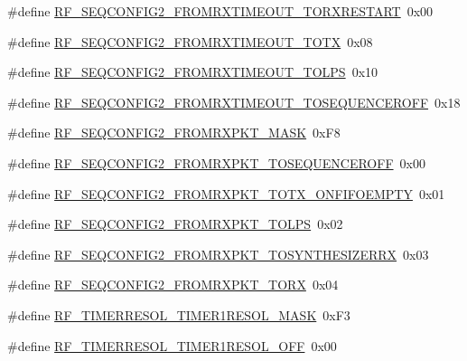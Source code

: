 \begin{DoxyCompactItemize}
\#define \hyperlink{sx1276Regs-Fsk_8h_a61f477238d6ab34794c6beb2075f7c74}{R\+F\+\_\+\+S\+E\+Q\+C\+O\+N\+F\+I\+G2\+\_\+\+F\+R\+O\+M\+R\+X\+T\+I\+M\+E\+O\+U\+T\+\_\+\+T\+O\+R\+X\+R\+E\+S\+T\+A\+RT}~0x00
\item 
\#define \hyperlink{sx1276Regs-Fsk_8h_aafadf4e3c6d5afde4f45a52b150ac010}{R\+F\+\_\+\+S\+E\+Q\+C\+O\+N\+F\+I\+G2\+\_\+\+F\+R\+O\+M\+R\+X\+T\+I\+M\+E\+O\+U\+T\+\_\+\+T\+O\+TX}~0x08
\item 
\#define \hyperlink{sx1276Regs-Fsk_8h_a1e8856528e554ac06c0b15a0331af25f}{R\+F\+\_\+\+S\+E\+Q\+C\+O\+N\+F\+I\+G2\+\_\+\+F\+R\+O\+M\+R\+X\+T\+I\+M\+E\+O\+U\+T\+\_\+\+T\+O\+L\+PS}~0x10
\item 
\#define \hyperlink{sx1276Regs-Fsk_8h_ac8284b2e9e769af716e7e9e69d7489c3}{R\+F\+\_\+\+S\+E\+Q\+C\+O\+N\+F\+I\+G2\+\_\+\+F\+R\+O\+M\+R\+X\+T\+I\+M\+E\+O\+U\+T\+\_\+\+T\+O\+S\+E\+Q\+U\+E\+N\+C\+E\+R\+O\+FF}~0x18
\item 
\#define \hyperlink{sx1276Regs-Fsk_8h_af969ae590556e2c15a447e7fc528bd41}{R\+F\+\_\+\+S\+E\+Q\+C\+O\+N\+F\+I\+G2\+\_\+\+F\+R\+O\+M\+R\+X\+P\+K\+T\+\_\+\+M\+A\+SK}~0x\+F8
\item 
\#define \hyperlink{sx1276Regs-Fsk_8h_a6540dab5dd5ba1667a344a2c1f40a16e}{R\+F\+\_\+\+S\+E\+Q\+C\+O\+N\+F\+I\+G2\+\_\+\+F\+R\+O\+M\+R\+X\+P\+K\+T\+\_\+\+T\+O\+S\+E\+Q\+U\+E\+N\+C\+E\+R\+O\+FF}~0x00
\item 
\#define \hyperlink{sx1276Regs-Fsk_8h_a967bc541983c4f4ffd13d25eb67a751f}{R\+F\+\_\+\+S\+E\+Q\+C\+O\+N\+F\+I\+G2\+\_\+\+F\+R\+O\+M\+R\+X\+P\+K\+T\+\_\+\+T\+O\+T\+X\+\_\+\+O\+N\+F\+I\+F\+O\+E\+M\+P\+TY}~0x01
\item 
\#define \hyperlink{sx1276Regs-Fsk_8h_aa27b9d5f133d0c76752de6696f68de93}{R\+F\+\_\+\+S\+E\+Q\+C\+O\+N\+F\+I\+G2\+\_\+\+F\+R\+O\+M\+R\+X\+P\+K\+T\+\_\+\+T\+O\+L\+PS}~0x02
\item 
\#define \hyperlink{sx1276Regs-Fsk_8h_a23dbeccd9f9305bc5e606ad683a2e26c}{R\+F\+\_\+\+S\+E\+Q\+C\+O\+N\+F\+I\+G2\+\_\+\+F\+R\+O\+M\+R\+X\+P\+K\+T\+\_\+\+T\+O\+S\+Y\+N\+T\+H\+E\+S\+I\+Z\+E\+R\+RX}~0x03
\item 
\#define \hyperlink{sx1276Regs-Fsk_8h_a3d05f39e4ba0e2326381877cde06c05d}{R\+F\+\_\+\+S\+E\+Q\+C\+O\+N\+F\+I\+G2\+\_\+\+F\+R\+O\+M\+R\+X\+P\+K\+T\+\_\+\+T\+O\+RX}~0x04
\item 
\#define \hyperlink{sx1276Regs-Fsk_8h_afefc0f259bc8bcdde6d343b3dc397499}{R\+F\+\_\+\+T\+I\+M\+E\+R\+R\+E\+S\+O\+L\+\_\+\+T\+I\+M\+E\+R1\+R\+E\+S\+O\+L\+\_\+\+M\+A\+SK}~0x\+F3
\item 
\#define \hyperlink{sx1276Regs-Fsk_8h_a06e61a3885ef4ec1cdf878d7f733185d}{R\+F\+\_\+\+T\+I\+M\+E\+R\+R\+E\+S\+O\+L\+\_\+\+T\+I\+M\+E\+R1\+R\+E\+S\+O\+L\+\_\+\+O\+FF}~0x00

\end{DoxyCompactItemize}
